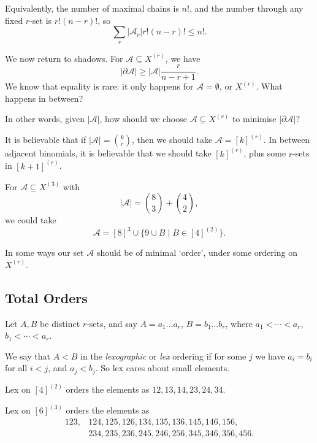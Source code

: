 \documentclass[12pt]{article}
\begin{document}
Equivalently, the number of maximal chains is $n!$, and the number through any fixed $r$-set is $r!(n-r)!$, so
\[
\sum_r |\mathcal{A}_r| r! (n-r)! \leq n!.
\]

We now return to shadows. For $\mathcal{A} \subseteq X^{(r)}$, we have
\[
|\partial \mathcal{A}| \geq |\mathcal{A}| \frac{r}{n - r + 1}.
\]
We know that equality is rare: it only happens for $\mathcal{A} = \emptyset$, or $X^{(r)}$. What happens in between?

In other words, given $|\mathcal{A}|$, how should we choose $\mathcal{A} \subseteq X^{(r)}$ to minimise $|\partial \mathcal{A}|$?

It is believable that if $|\mathcal{A}| = \binom kr$, then we should take $\mathcal{A} = [k]^{(r)}$. In between adjacent binomials, it is believable that we should take $[k]^{(r)}$, plus some $r$-sets in $[k+1]^{(r)}$.

\begin{exbox}
	For $\mathcal{A} \subseteq X^{(3)}$ with 
	\[
	|\mathcal{A}| = \binom 83 + \binom 42,
	\]
	we could take
	\[
		\mathcal{A} = [8]^3 \cup \{9 \cup B \mid B \in [4]^{(2)}\}.
	\]
\end{exbox}

In some ways our set $\mathcal{A}$ should be of minimal `order', under some ordering on $X^{(r)}$.

\subsection{Total Orders}%
\label{sub:to_xr}

Let $A, B$ be distinct $r$-sets, and say $A = a_1 \ldots a_r$, $B = b_1 \ldots b_r$, where $a_1 < \cdots < a_r$, $b_1 < \cdots < a_r$.

We say that $A < B$ in the \emph{lexographic} or \emph{lex} ordering if for some $j$ we have $a_i = b_i$ for all $i < j$, and $a_j < b_j$. So lex cares about small elements.

\begin{exbox}
	Lex on $[4]^{(2)}$ orders the elements as $12, 13, 14, 23, 24, 34$.

	Lex on $[6]^{(3)}$ orders the elements as
	\begin{align*}
		123, &124, 125, 126, 134, 135, 136, 145, 146, 156, \\
		     &234, 235, 236, 245, 246, 256, 345, 346, 356, 456.
	\end{align*}
\end{exbox}
\end{document}
